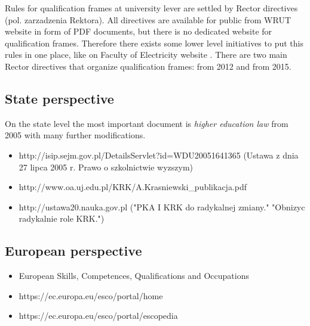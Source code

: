 \documentclass{report}
\begin{document}
Rules for qualification frames at university lever are settled by Rector
directives (pol. zarzadzenia Rektora). All directives are available for public
from WRUT website in form of PDF documents, but there is no dedicated website
for qualification frames. Therefore there exists some lower level initiatives
to put this rules in one place, like on Faculty of Electricity website
\cite{web:weny-krk}. There are two main Rector directives that organize
qualification frames: from 2012\cite{web:2012-krk} and from
2015\cite{web:2015-krk}.

\subsection{State perspective}
On the state level the most important document is \textit{higher education
law} from 2005 with many further modifications.
\begin{itemize}
  \item http://isip.sejm.gov.pl/DetailsServlet?id=WDU20051641365
    (Ustawa z dnia 27 lipca 2005 r. Prawo o szkolnictwie wyzszym)
  \item http://www.oa.uj.edu.pl/KRK/A.Krasniewski\_publikacja.pdf
  \item http://ustawa20.nauka.gov.pl
    ("PKA I KRK do radykalnej zmiany."
    "Obnizyc radykalnie role KRK.")
\end{itemize}

\subsection{European perspective}
\begin{itemize}
  \item European Skills, Competences, Qualifications and Occupations
  \item https://ec.europa.eu/esco/portal/home
  \item https://ec.europa.eu/esco/portal/escopedia
\end{itemize}

\end{document}
